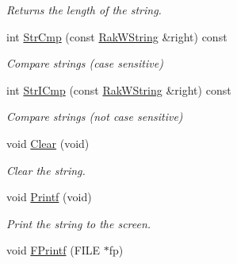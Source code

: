 \begin{DoxyCompactItemize}
\begin{DoxyCompactList}\small\item\em Returns the length of the string. \end{DoxyCompactList}\item 
\hypertarget{class_rak_net_1_1_rak_w_string_ae2f385506b225b69326361fbce2403a9}{int \hyperlink{class_rak_net_1_1_rak_w_string_ae2f385506b225b69326361fbce2403a9}{Str\-Cmp} (const \hyperlink{class_rak_net_1_1_rak_w_string}{Rak\-W\-String} \&right) const }\label{class_rak_net_1_1_rak_w_string_ae2f385506b225b69326361fbce2403a9}

\begin{DoxyCompactList}\small\item\em Compare strings (case sensitive) \end{DoxyCompactList}\item 
\hypertarget{class_rak_net_1_1_rak_w_string_a3b16eca8d89b4aef74e6c65d1193ef31}{int \hyperlink{class_rak_net_1_1_rak_w_string_a3b16eca8d89b4aef74e6c65d1193ef31}{Str\-I\-Cmp} (const \hyperlink{class_rak_net_1_1_rak_w_string}{Rak\-W\-String} \&right) const }\label{class_rak_net_1_1_rak_w_string_a3b16eca8d89b4aef74e6c65d1193ef31}

\begin{DoxyCompactList}\small\item\em Compare strings (not case sensitive) \end{DoxyCompactList}\item 
\hypertarget{class_rak_net_1_1_rak_w_string_ace1f1971dbe2a87fbdfef042522d2569}{void \hyperlink{class_rak_net_1_1_rak_w_string_ace1f1971dbe2a87fbdfef042522d2569}{Clear} (void)}\label{class_rak_net_1_1_rak_w_string_ace1f1971dbe2a87fbdfef042522d2569}

\begin{DoxyCompactList}\small\item\em Clear the string. \end{DoxyCompactList}\item 
\hypertarget{class_rak_net_1_1_rak_w_string_aea7996f6dce7d32eeaaeea3aa8bfe834}{void \hyperlink{class_rak_net_1_1_rak_w_string_aea7996f6dce7d32eeaaeea3aa8bfe834}{Printf} (void)}\label{class_rak_net_1_1_rak_w_string_aea7996f6dce7d32eeaaeea3aa8bfe834}

\begin{DoxyCompactList}\small\item\em Print the string to the screen. \end{DoxyCompactList}\item 
\hypertarget{class_rak_net_1_1_rak_w_string_a31398f4873e03b5050d60162a42ba471}{void \hyperlink{class_rak_net_1_1_rak_w_string_a31398f4873e03b5050d60162a42ba471}{F\-Printf} (F\-I\-L\-E $\ast$fp)}\label{class_rak_net_1_1_rak_w_string_a31398f4873e03b5050d60162a42ba471}


\end{DoxyCompactItemize}
